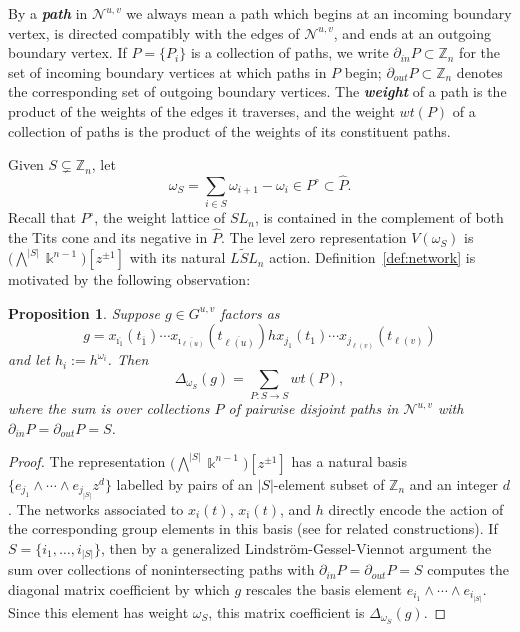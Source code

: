 \documentclass[12pt]{amsart}
\newcommand{\newword}[1]{\textbf{\emph{#1}}}
\newcommand{\ZZ}{\mathbb{Z}}
\newcommand{\kk}{\Bbbk}
\newcommand{\cN}{\mathcal{N}} %
\newcommand{\ol}[1]{\overline{#1}}
\newcommand{\loopvar}{z}
\newtheorem{proposition}[theorem]{Proposition}
\theoremstyle{remark}
\numberwithin{equation}{section}
\numberwithin{figure}{section}
\begin{document}
By a \newword{path} in $\cN^{u,v}$ we always mean a path which begins at an incoming boundary vertex, is directed compatibly with the edges of $\cN^{u,v}$, and ends at an outgoing boundary vertex.
If $P = \{P_i\}$ is a collection of paths, we write $\partial_{in}P \subset \ZZ_n$ for the set of incoming boundary vertices at which paths in $P$ begin; $\partial_{out}P \subset \ZZ_n$ denotes the corresponding set of outgoing boundary vertices.
The \newword{weight} of a path is the product of the weights of the edges it traverses, and the weight $wt(P)$ of a collection of paths is the product of the weights of its constituent paths.

Given $S \subsetneq \ZZ_n$, let
\[
  \omega_S
  =
  \sum_{i \in S} \omega_{i+1} - \omega_i \in P^\circ \subset \widehat{P}.
\]
Recall that $P^\circ$, the weight lattice of $SL_n$, is contained in the complement of both the Tits cone and its negative in $\widehat{P}$.
The level zero representation $V(\omega_S)$ is $\big(\bigwedge^{|S|}\kk^{n-1}\big)[\loopvar^{\pm 1}]$ with its natural $\widetilde{LSL}_n$ action.
Definition~\ref{def:network} is motivated by the following observation:

\begin{proposition}
  \label{prop:minorsfrompaths}
  Suppose $g\in G^{u,v}$ factors as
  \[
  g = x_{\ol{\imath_1}}(t_{\ol{1}})\cdots x_{\ol{\imath_{\ell(u)}}}(t_{\ol{\ell(u)}})hx_{j_1}(t_{1}) \cdots x_{j_{\ell(v)}}(t_{\ell(v)})
  \]
  and let $h_i:= h^{\omega_i}$.
  Then
  \[
    \Delta_{\omega_S}(g) = \sum_{P: S \to S} wt(P),
  \]
  where the sum is over collections $P$ of pairwise disjoint paths in $\cN^{u,v}$ with $\partial_{in}P = \partial_{out}P = S$.
\end{proposition}
\begin{proof}
  The representation $\big(\bigwedge^{|S|}\kk^{n-1}\big)[\loopvar^{\pm 1}]$ has a natural basis $\{ e_{j_1} \wedge \cdots \wedge e_{j_{|S|}} \loopvar^d\}$ labelled by pairs of an $|S|$-element subset of $\ZZ_n$ and an integer $d$.
  The networks associated to $x_i(t)$, $x_{\ol{\imath}}(t)$, and $h$ directly encode the action of the corresponding group elements in this basis (see \cite{GSV12,FM14} for related constructions).
  If $S = \{i_1,\dotsc,i_{|S|}\}$, then by a generalized Lindstr\"om-Gessel-Viennot argument the sum over collections of nonintersecting paths with $\partial_{in}P = \partial_{out}P = S$ computes the diagonal matrix coefficient by which $g$ rescales the basis element $e_{i_1} \wedge \cdots \wedge e_{i_{|S|}}$.
  Since this element has weight $\omega_S$, this matrix coefficient is $\Delta_{\omega_S}(g)$.
\end{proof}
\end{document}
